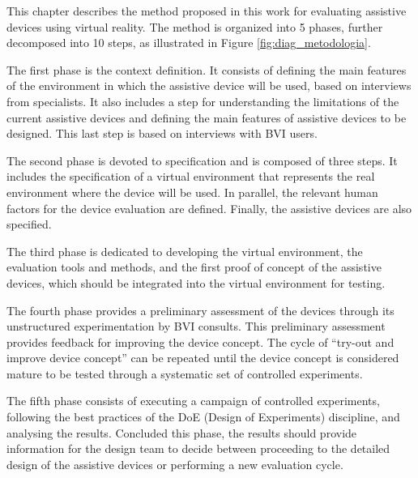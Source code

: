 


This chapter describes the method proposed in this work for evaluating assistive devices using virtual reality. The method is organized into 5 phases, further decomposed into 10 steps, as illustrated in Figure \ref{fig:diag_metodologia}.





The first phase is the context definition. It consists of defining the main features of the environment in which the assistive device will be used, based on interviews from specialists. It also includes a step for understanding the limitations of the current assistive devices and defining the main features of assistive devices to be designed. This last step is based on interviews with BVI users.

The second phase is devoted to specification and is composed of three steps. It includes the specification of a virtual environment that represents the real environment where the device will be used. In parallel, the relevant human factors for the device evaluation are defined. Finally, the assistive devices are also specified.

The third phase is dedicated to developing the virtual environment, the evaluation tools and methods, and the first proof of concept of the assistive devices, which should be integrated into the virtual environment for testing. 

The fourth phase provides a preliminary assessment of the devices through its unstructured experimentation by BVI consults. This preliminary assessment provides feedback for improving the device concept. The cycle of “try-out and improve device concept” can be repeated until the device concept is considered mature to be tested through a systematic set of controlled experiments.

The fifth phase consists of executing a campaign of controlled experiments, following the best practices of the DoE (Design of Experiments) discipline, and analysing the results. Concluded this phase, the results should provide information for the design team to decide between proceeding to the detailed design of the assistive devices or performing a new evaluation cycle.

